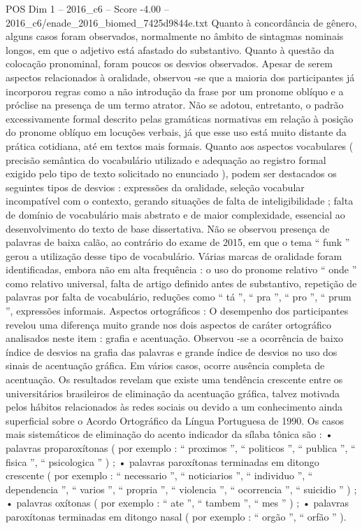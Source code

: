 \begin{textsample}{POS Dim 1 – 2016\_c6 – Score -4.00 – 2016\_c6/enade\_2016\_biomed\_7425d9844e.txt}
Quanto à concordância de gênero, alguns casos foram observados, normalmente no âmbito de sintagmas nominais longos, em que o adjetivo está afastado do substantivo.
Quanto à questão da colocação pronominal, foram poucos os desvios observados.
Apesar de serem aspectos relacionados à oralidade, observou -se que a maioria dos participantes já incorporou regras como a não introdução da frase por um pronome oblíquo e a próclise na presença de um termo atrator.
Não se adotou, entretanto, o padrão excessivamente formal descrito pelas gramáticas normativas em relação à posição do pronome oblíquo em locuções verbais, já que esse uso está muito distante da prática cotidiana, até em textos mais formais.
Quanto aos aspectos vocabulares ( precisão semântica do vocabulário utilizado e adequação ao registro formal exigido pelo tipo de texto solicitado no enunciado ), podem ser destacados os seguintes tipos de desvios : expressões da oralidade, seleção vocabular incompatível com o contexto, gerando situações de falta de inteligibilidade ; falta de domínio de vocabulário mais abstrato e de maior complexidade, essencial ao desenvolvimento do texto de base dissertativa.
Não se observou presença de palavras de baixa calão, ao contrário do exame de 2015, em que o tema “ funk ” gerou a utilização desse tipo de vocabulário.
Várias marcas de oralidade foram identificadas, embora não em alta frequência : o uso do pronome relativo “ onde ” como relativo universal, falta de artigo definido antes de substantivo, repetição de palavras por falta de vocabulário, reduções como “ tá ”, “ pra ”, “ pro ”, “ prum ”, expressões informais.
Aspectos ortográficos : O desempenho dos participantes revelou uma diferença muito grande nos dois aspectos de caráter ortográfico analisados neste item : grafia e acentuação.
Observou -se a ocorrência de baixo índice de desvios na grafia das palavras e grande índice de desvios no uso dos sinais de acentuação gráfica.
Em vários casos, ocorre ausência completa de acentuação.
Os resultados revelam que existe uma tendência crescente entre os universitários brasileiros de eliminação da acentuação gráfica, talvez motivada pelos hábitos relacionados às redes sociais ou devido a um conhecimento ainda superficial sobre o Acordo Ortográfico da Língua Portuguesa de 1990.
Os casos mais sistemáticos de eliminação do acento indicador da sílaba tônica são : • palavras proparoxítonas ( por exemplo : “ proximos ”, “ politicos ”, “ publica ”, “ fisica ”, “ psicologica ” ) ; • palavras paroxítonas terminadas em ditongo crescente ( por exemplo : “ necessario ”, “ noticiarios ”, “ individuo ”, “ dependencia ”, “ varios ”, “ propria ”, “ violencia ”, “ ocorrencia ”, “ suicidio ” ) ; • palavras oxítonas ( por exemplo : “ ate ”, “ tambem ”, “ mes ” ) ; • palavras paroxítonas terminadas em ditongo nasal ( por exemplo : “ orgão ”, “ orfão ” ).

\end{textsample}
